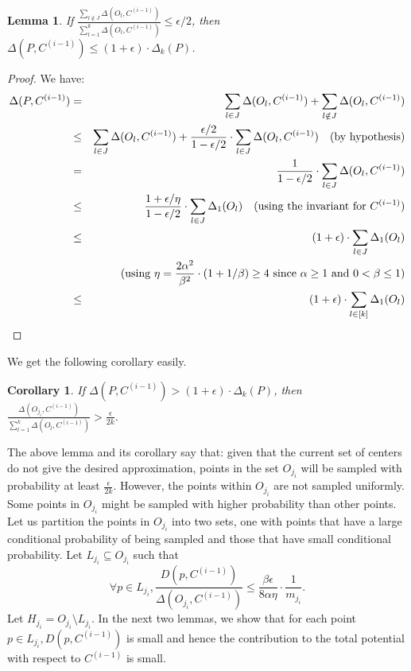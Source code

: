\documentclass[11pt]{article}
\newtheorem{lemma}{Lemma}
\newtheorem{corollary}{Corollary}
\newcommand{\eps}{{\epsilon}}
\newcommand{\C}[1]{{{C}^{(#1)}}}
\begin{document}
\begin{lemma}
\label{lem:sampled-repeat}
If $\frac{\sum_{l \notin J} \Delta(O_l, \C{i-1})}{\sum_{l=1}^k \Delta(O_l, \C{i-1})} \leq \eps/2$, then $\Delta(P, C^{(i-1)}) \leq (1 + \eps) \cdot \Delta_k(P)$.
\end{lemma}
\begin{proof}
We have:
{
\allowdisplaybreaks
\begin{eqnarray*}
\Delta(P, \C{i-1}) &=& \sum_{l \in J}  \Delta(O_l, \C{i-1}) +  \sum_{l \notin J} \Delta(O_l, \C{i-1})  \\
&\leq&  \sum_{l \in J} \Delta(O_l, \C{i-1})  +  \frac{\eps/2}{1 - \eps/2} \cdot \sum_{l \in J}  \Delta(O_l, \C{i-1})
\quad \textrm{(by hypothesis)}\\
&=& \frac{1}{1 - \eps/2} \cdot \sum_{l \in J} \Delta(O_l, \C{i-1}) \\
&\leq& \frac{1 + \eps/\eta}{1 - \eps/2} \cdot \sum_{l \in J}  \Delta_1(O_l) \quad \textrm{(using the invariant for $\C{i-1}$)}\\
&\leq& (1+\eps) \cdot  \sum_{l \in J}  \Delta_1(O_l) \\
&& \textrm{(using  $\eta = \frac{2\alpha^2}{\beta^2} \cdot (1 + 1/\beta) \geq 4$ since $\alpha \geq 1$ and $0 < \beta \leq 1$)}\\
&\leq& (1+\eps) \cdot  \sum_{l \in [k]}  \Delta_1(O_l) \qedhere
\end{eqnarray*}
}
\end{proof}

\noindent
We get the following corollary easily.
\begin{corollary}
\label{cor:sample-repeat}
If $\Delta(P, C^{(i-1)}) > (1+\eps) \cdot \Delta_k(P)$, then $ \frac{\Delta(O_{j_i}, \C{i-1})}{\sum_{l=1}^k  \Delta(O_l, \C{i-1})} > \frac{\eps}{2k}.$
\end{corollary}

The above lemma and its corollary say that: given that the current set of centers do not give the desired approximation, points in the set $O_{j_i}$ will be sampled with probability at least $\frac{\eps}{2k}$.
However, the points within $O_{j_i}$ are not sampled uniformly.
Some points in $O_{j_i}$ might be sampled with higher probability than other points.
Let us partition the points in $O_{j_i}$ into two sets, one with points that have a large conditional probability of being sampled and those that have small conditional probability.
Let $L_{j_i} \subseteq O_{j_i}$ such that 
\begin{equation}\label{eqn:partition}
\forall p \in L_{j_i}, \frac{D(p, C^{(i-1)})}{\Delta(O_{j_i}, C^{(i-1)})} \leq \frac{\beta \eps}{8 \alpha \eta} \cdot \frac{1}{m_{j_i}}. 
\end{equation}
Let $H_{j_i} = O_{j_i} \setminus L_{j_i}$.
In the next two lemmas, we show that for each point $p \in L_{j_i}, D(p, C^{(i-1)})$ is small and hence the contribution to the total potential with respect to $C^{(i-1)}$ is small. 
\end{document}
